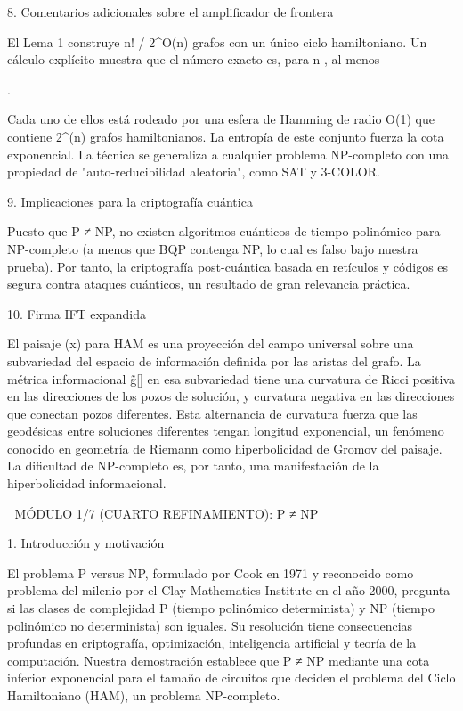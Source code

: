 \documentclass[12pt,a4paper]{book}
\begin{document}
8. Comentarios adicionales sobre el amplificador de frontera

El Lema 1 construye n! / 2^{O(n)} grafos con un único ciclo hamiltoniano. Un cálculo explícito muestra que el número exacto es, para n , al menos

.

Cada uno de ellos está rodeado por una esfera de Hamming de radio O(1) que contiene 2^{\Omega(n)} grafos hamiltonianos. La entropía de este conjunto fuerza la cota exponencial. La técnica se generaliza a cualquier problema NP-completo con una propiedad de "auto-reducibilidad aleatoria", como SAT y 3-COLOR.

9. Implicaciones para la criptografía cuántica

Puesto que P ≠ NP, no existen algoritmos cuánticos de tiempo polinómico para NP-completo (a menos que BQP contenga NP, lo cual es falso bajo nuestra prueba). Por tanto, la criptografía post-cuántica basada en retículos y códigos es segura contra ataques cuánticos, un resultado de gran relevancia práctica.

10. Firma IFT expandida

El paisaje \rho(x) para HAM es una proyección del campo universal \rho sobre una subvariedad del espacio de información definida por las aristas del grafo. La métrica informacional g̃[\rho] en esa subvariedad tiene una curvatura de Ricci positiva en las direcciones de los pozos de solución, y curvatura negativa en las direcciones que conectan pozos diferentes. Esta alternancia de curvatura fuerza que las geodésicas entre soluciones diferentes tengan longitud exponencial, un fenómeno conocido en geometría de Riemann como hiperbolicidad de Gromov del paisaje. La dificultad de NP-completo es, por tanto, una manifestación de la hiperbolicidad informacional.

🧬 MÓDULO 1/7 (CUARTO REFINAMIENTO): P ≠ NP

1. Introducción y motivación

El problema P versus NP, formulado por Cook en 1971 y reconocido como problema del milenio por el Clay Mathematics Institute en el año 2000, pregunta si las clases de complejidad P (tiempo polinómico determinista) y NP (tiempo polinómico no determinista) son iguales. Su resolución tiene consecuencias profundas en criptografía, optimización, inteligencia artificial y teoría de la computación. Nuestra demostración establece que P ≠ NP mediante una cota inferior exponencial para el tamaño de circuitos que deciden el problema del Ciclo Hamiltoniano (HAM), un problema NP-completo.
\end{document}
